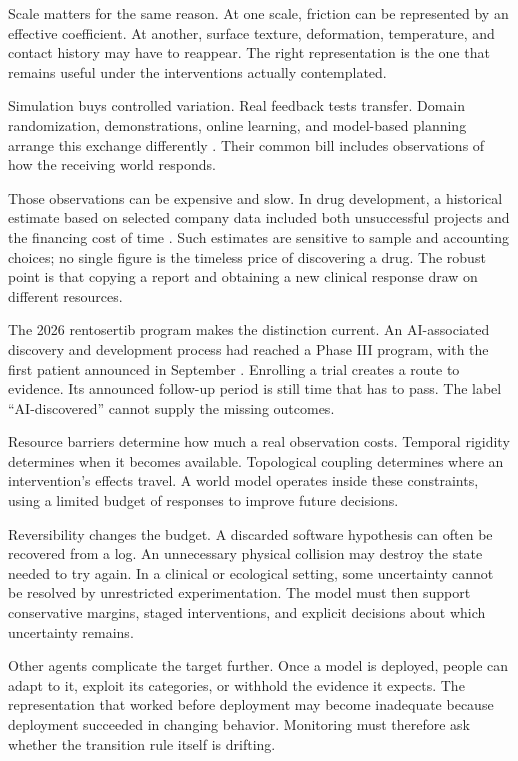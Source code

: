 \documentclass[11pt,openany]{book}
\begin{document}
Scale matters for the same reason. At one scale, friction can be represented by an effective coefficient. At another, surface texture, deformation, temperature, and contact history may have to reappear. The right representation is the one that remains useful under the interventions actually contemplated.

Simulation buys controlled variation. Real feedback tests transfer. Domain randomization, demonstrations, online learning, and model-based planning arrange this exchange differently \cite{tobin2017domain}. Their common bill includes observations of how the receiving world responds.

Those observations can be expensive and slow. In drug development, a historical estimate based on selected company data included both unsuccessful projects and the financing cost of time \cite{dimasi2016}. Such estimates are sensitive to sample and accounting choices; no single figure is the timeless price of discovering a drug. The robust point is that copying a report and obtaining a new clinical response draw on different resources.

The 2026 rentosertib program makes the distinction current. An AI-associated discovery and development process had reached a Phase III program, with the first patient announced in September \cite{insilico2026phase3}. Enrolling a trial creates a route to evidence. Its announced follow-up period is still time that has to pass. The label “AI-discovered” cannot supply the missing outcomes.

Resource barriers determine how much a real observation costs. Temporal rigidity determines when it becomes available. Topological coupling determines where an intervention's effects travel. A world model operates inside these constraints, using a limited budget of responses to improve future decisions.

Reversibility changes the budget. A discarded software hypothesis can often be recovered from a log. An unnecessary physical collision may destroy the state needed to try again. In a clinical or ecological setting, some uncertainty cannot be resolved by unrestricted experimentation. The model must then support conservative margins, staged interventions, and explicit decisions about which uncertainty remains.

Other agents complicate the target further. Once a model is deployed, people can adapt to it, exploit its categories, or withhold the evidence it expects. The representation that worked before deployment may become inadequate because deployment succeeded in changing behavior. Monitoring must therefore ask whether the transition rule itself is drifting.
\end{document}
